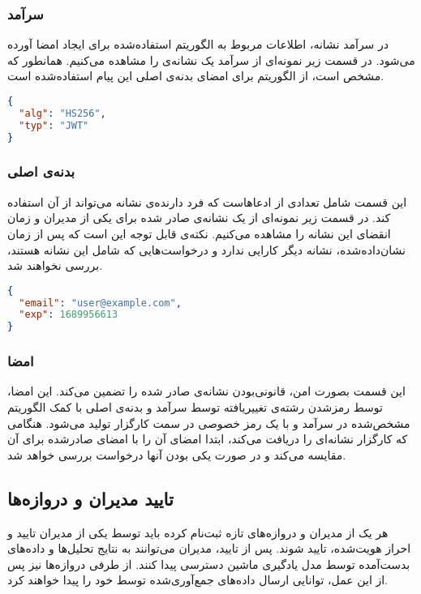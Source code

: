 \subsubsection{سرآمد}
در سرآمد نشانه، اطلاعات مربوط به الگوریتم استفاده‌شده برای ایجاد امضا آورده می‌شود. در قسمت زیر نمونه‌ای از سرآمد یک نشانه‌ی  را مشاهده می‌کنیم. همانطور که مشخص است، از الگوریتم  برای امضای بدنه‌ی اصلی این پیام استفاده‌شده است.

\begin{latin}
\begin{lstlisting}[language=json,firstnumber=1]
{
  "alg": "HS256",
  "typ": "JWT"
}
\end{lstlisting}
\end{latin}

\subsubsection{بدنه‌ی اصلی}
این قسمت شامل تعدادی از ادعاهاست که فرد دارنده‌ی نشانه می‌تواند از آن استفاده کند. در قسمت زیر نمونه‌ای از یک نشانه‌ی صادر شده برای یکی از مدیران و زمان انقضای این نشانه را مشاهده می‌کنیم. نکته‌ی قابل توجه این است که پس از زمان نشان‌داده‌شده، نشانه دیگر کارایی ندارد و درخواست‌هایی که شامل این نشانه هستند، بررسی نخواهند شد.

\begin{latin}
\begin{lstlisting}[language=json,firstnumber=1]
{
  "email": "user@example.com",
  "exp": 1689956613
}
\end{lstlisting}
\end{latin}

\subsubsection{امضا}
این قسمت بصورت امن، قانونی‌بودن نشانه‌ی صادر شده را تضمین می‌کند. این امضا، توسط رمزشدن رشته‌ی تغییر‌یافته توسط  سرآمد و بدنه‌ی اصلی با کمک الگوریتم مشخص‌شده در سرآمد و با یک رمز خصوصی در سمت کارگزار تولید می‌شود. هنگامی که کارگزار نشانه‌ای را دریافت می‌کند، ابتدا امضای آن را با امضای صادرشده برای آن مقایسه می‌کند و در صورت یکی بودن آنها درخواست بررسی خواهد شد.


\subsection{تایید مدیران و دروازه‌ها}
هر یک از مدیران و دروازه‌های تازه ثبت‌نام کرده باید توسط یکی از مدیران تایید‌ و احراز هویت‌شده، تایید شوند. پس از تایید، مدیران می‌توانند به نتایج تحلیل‌ها و داده‌های بدست‌آمده توسط مدل یادگیری ماشین دسترسی پیدا کنند. از طرفی دروازه‌ها نیز پس از این عمل، توانایی ارسال داده‌های جمع‌آوری‌شده توسط خود را پیدا خواهند کرد. 

